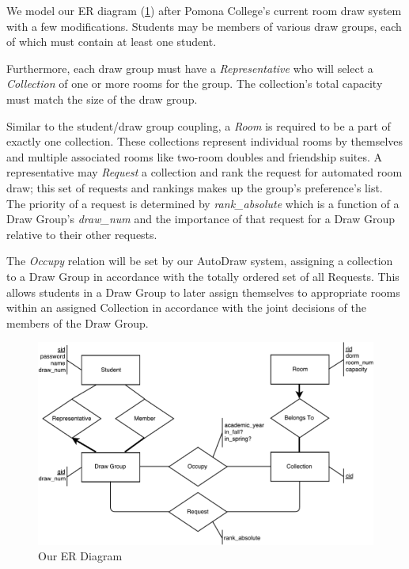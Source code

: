 We model our ER diagram (\cref{fig:er-diagram}) after Pomona College's current
room draw system with a few modifications. Students may be members of various
draw groups, each of which must contain at least one student. 

Furthermore, each draw group must have a \emph{Representative} who
will select a \emph{Collection} of one or more rooms for the group. The collection's total
capacity must match the size of the draw group. 

Similar to the student/draw group coupling, a
\emph{Room} is required to be a part of exactly one collection. These
collections represent individual rooms by themselves and multiple associated rooms like
two-room doubles and friendship suites. A representative may \emph{Request} a
collection and rank the request for automated room draw; this set of requests and rankings makes up
the group's preference's list. The priority of a request is determined by \emph{rank\_absolute}
which is a function of a Draw Group's \emph{draw\_num} and the importance of that request for
a Draw Group relative to their other requests. 

The \emph{Occupy} relation will be set by our AutoDraw system, assigning a collection
to a Draw Group in accordance with the totally ordered set of all Requests. This allows
students in a Draw Group to later assign themselves to appropriate rooms within an 
assigned Collection in accordance with the joint decisions of the members of the Draw Group. 

\begin{figure}[H] \centering
\includegraphics[width=\textwidth]{er_crop.pdf}
\caption{Our ER Diagram}
\label{fig:er-diagram}
\end{figure}
